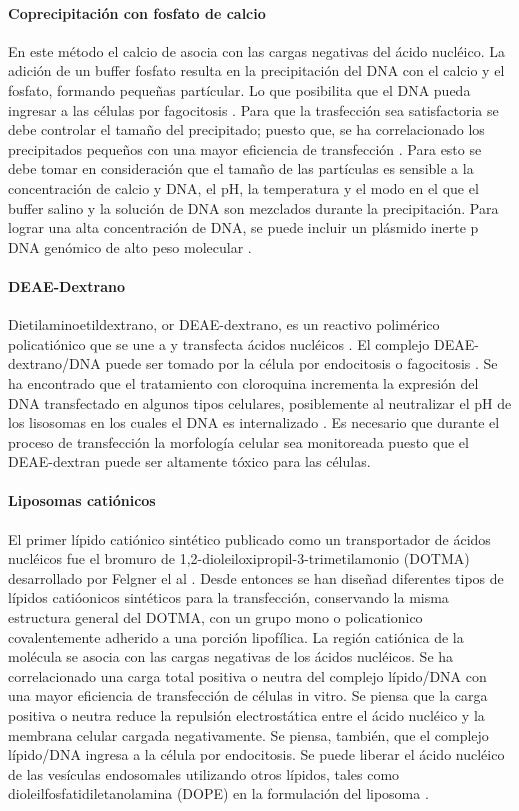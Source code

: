 \documentclass[fleqn,10pt]{SelfArx} %
\begin{document}
\paragraph*{Coprecipitación con fosfato de calcio}
En este método el calcio de asocia con las cargas negativas del ácido nucléico. La adición de un buffer fosfato resulta en la precipitación del DNA con el calcio y el fosfato, formando pequeñas partícular.  Lo que posibilita que el DNA pueda ingresar a las células por fagocitosis \cite{Loyter:1982aa}. Para que la trasfección sea satisfactoria se debe controlar el tamaño del precipitado; puesto que, se ha correlacionado los precipitados pequeños con una mayor eficiencia de transfección \cite{Jordan:1996aa}. Para esto se debe tomar en consideración que el tamaño de las partículas es sensible a la concentración de calcio y DNA, el pH, la temperatura y el modo en el que el buffer salino y la solución de DNA son mezclados durante la precipitación. Para lograr una alta concentración de DNA, se puede incluir un plásmido inerte p DNA genómico de alto peso molecular \cite{Strain:1985aa}.

\paragraph*{DEAE-Dextrano}
Dietilaminoetildextrano, or DEAE-dextrano, es un reactivo polimérico policatiónico que se une a y transfecta ácidos nucléicos \cite{McCutchan:1968aa}.  El complejo DEAE-dextrano/DNA puede ser tomado por la célula por endocitosis o fagocitosis \cite{Yang:1997aa, Luthman:1983aa}. Se ha encontrado que el tratamiento con cloroquina incrementa la expresión del DNA transfectado en algunos tipos celulares, posiblemente al neutralizar el pH de los lisosomas en los cuales el DNA es internalizado \cite{Luthman:1983aa}. Es necesario que durante el proceso de transfección la morfología celular sea monitoreada puesto que el DEAE-dextran puede ser altamente tóxico para las células.

\paragraph*{Liposomas catiónicos}
El primer lípido catiónico sintético publicado como un transportador de ácidos nucléicos fue el bromuro de 1,2-dioleiloxipropil-3-trimetilamonio (DOTMA) desarrollado por Felgner el al \cite{Felgner01111987}. Desde entonces se han diseñad diferentes tipos de lípidos catióonicos sintéticos para la transfección, conservando la misma estructura general del DOTMA, con un grupo mono o policationico covalentemente adherido a una porción lipofílica. La región catiónica de la molécula se asocia con las cargas negativas de los ácidos nucléicos. Se ha correlacionado una carga total positiva o neutra del complejo lípido/DNA con una mayor eficiencia de transfección de células in vitro. Se piensa que la carga positiva o neutra reduce la repulsión electrostática entre el ácido nucléico y la membrana celular cargada negativamente. Se piensa, también, que el complejo lípido/DNA ingresa a la célula por endocitosis.  Se puede liberar el ácido nucléico de las vesículas endosomales utilizando otros lípidos, tales como dioleilfosfatidiletanolamina (DOPE) en la formulación del liposoma \cite{Farhood:1995aa}. 
\end{document}
